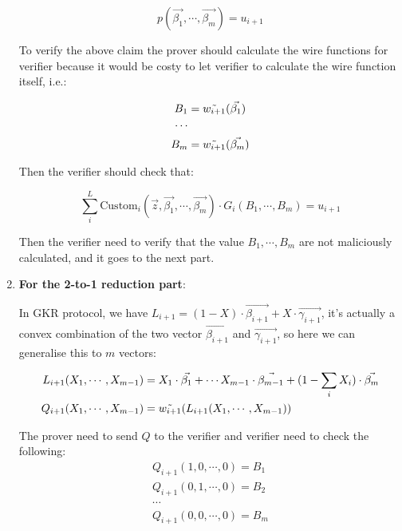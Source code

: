 \documentclass[12pt]{article}
\newenvironment{sol}[1][Solution]{\begin{trivlist}
\item[\hskip \labelsep {\bfseries #1:}]}{\end{trivlist}}
\begin{document}
\begin{sol}
\begin{enumerate}
              $$
                  p(\vec{\beta_1}, \cdots, \vec{\beta_m}) = u_{i+1}
              $$

              To verify the above claim the prover should calculate the wire functions for verifier because it would be costy to let verifier to calculate the wire function itself, i.e.:

              \begin{align*}
                  B_1 & = \Tilde{w_{i+1}}(\vec{\beta_1}) \\
                  \cdots                                 \\
                  B_m & = \Tilde{w_{i+1}}(\vec{\beta_m})
              \end{align*}

              Then the verifier should check that:

              $$
                  \sum_i^{L} \text{Custom}_i(\vec{z}, \vec{\beta_1}, \cdots, \vec{\beta_m}) \cdot G_i(B_1, \cdots, B_m) = u_{i+1}
              $$

              Then the verifier need to verify that the value $B_1, \cdots, B_m$ are not maliciously calculated, and it goes to the next part.

        \item \textbf{For the 2-to-1 reduction part}:

              In GKR protocol, we have $L_{i+1} = (1 - X) \cdot \vec{\beta_{i+1}} + X \cdot \vec{\gamma_{i+1}}$, it's actually a convex combination of the two vector $\vec{\beta_{i+1}}$ and $\vec{\gamma_{i+1}}$, so here we can generalise this to $m$ vectors:

              \begin{align*}
                  L_{i+1}(X_1, \cdots, X_{m-1}) & = X_1 \cdot \vec{\beta_1} + \cdots X_{m-1} \cdot \vec{\beta_{m-1}} + (1 - \sum_i X_i) \cdot \vec{\beta_m} \\
                  Q_{i+1}(X_1, \cdots, X_{m-1}) & = \Tilde{w_{i+1}}(L_{i+1}(X_1, \cdots, X_{m-1}))
              \end{align*}

              The prover need to send $Q$ to the verifier and verifier need to check the following:
              \begin{align*}
                  Q_{i+1}(1,0,\cdots,0) = B_1 \\
                  Q_{i+1}(0,1,\cdots,0) = B_2 \\
                  \cdots                      \\
                  Q_{i+1}(0,0,\cdots,0) = B_m
              \end{align*}


\end{enumerate}
\end{sol}
\end{document}
